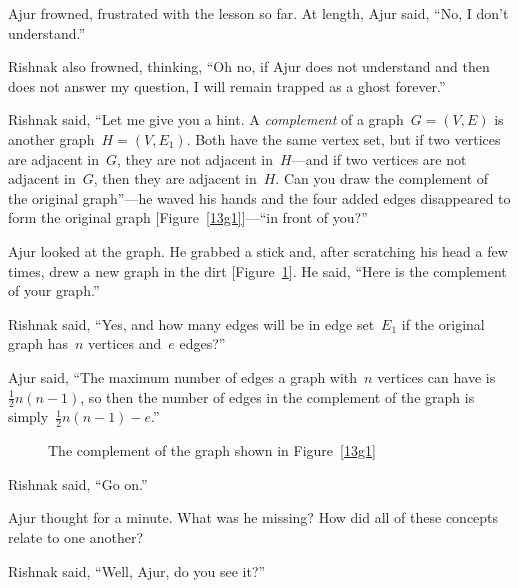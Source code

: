 Ajur frowned, frustrated with the lesson so far. At length, Ajur said, ``No, I don't understand.''

Rishnak also frowned, thinking, ``Oh no, if Ajur does not understand and then does not answer my question, I will remain trapped as a ghost forever.''

Rishnak said, ``Let me give you a hint. A \textit{complement} of a graph~$G=(V,E)$ is another graph~$H=(V,E_1)$. Both have the same vertex set, but if two vertices are adjacent in~$G$, they are not adjacent in~$H$---and if two vertices are not adjacent in~$G$, then they are adjacent in~$H$. Can you draw the complement of the original graph''---he waved his hands and the four added edges disappeared to form the original graph [Figure~\ref{13g1}]---``in front of you?''

Ajur looked at the graph. He grabbed a stick and, after scratching his head a few times, drew a new graph in the dirt [Figure~\ref{13g2}]. He said, ``Here is the complement of your graph.''

Rishnak said, ``Yes, and how many edges will be in edge set~$E_1$ if the original graph has~$n$ vertices and~$e$ edges?''

Ajur said, ``The maximum number of edges a graph with~$n$ vertices can have is~$\frac{1}{2}n(n-1)$, so then the number of edges in the complement of the graph is simply~$\frac{1}{2}n(n-1)-e$.''

\begin{figure}
\begin{center}
\caption{The complement of the graph shown in Figure~\ref{13g1}}\label{13g2}
\end{center}
\end{figure}

Rishnak said, ``Go on.''

Ajur thought for a minute. What was he missing? How did all of these concepts relate to one another?

Rishnak said, ``Well, Ajur, do you see it?''

